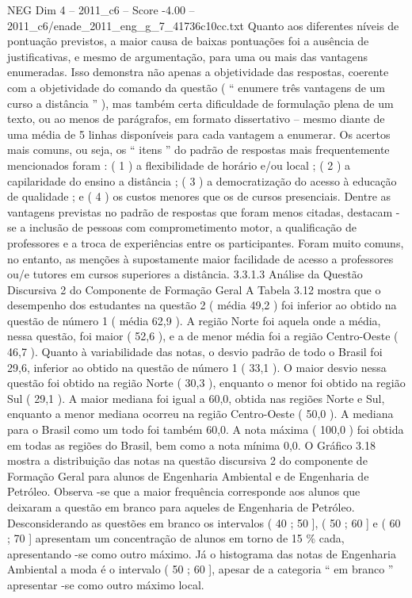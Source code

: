 \begin{textsample}{NEG Dim 4 – 2011\_c6 – Score -4.00 – 2011\_c6/enade\_2011\_eng\_g\_7\_41736c10cc.txt}
Quanto aos diferentes níveis de pontuação previstos, a maior causa de baixas pontuações foi a ausência de justificativas, e mesmo de argumentação, para uma ou mais das vantagens enumeradas.
Isso demonstra não apenas a objetividade das respostas, coerente com a objetividade do comando da questão ( “ enumere três vantagens de um curso a distância ” ), mas também certa dificuldade de formulação plena de um texto, ou ao menos de parágrafos, em formato dissertativo – mesmo diante de uma média de 5 linhas disponíveis para cada vantagem a enumerar.
Os acertos mais comuns, ou seja, os “ itens ” do padrão de respostas mais frequentemente mencionados foram : ( 1 ) a flexibilidade de horário e/ou local ; ( 2 ) a capilaridade do ensino a distância ; ( 3 ) a democratização do acesso à educação de qualidade ; e ( 4 ) os custos menores que os de cursos presenciais.
Dentre as vantagens previstas no padrão de respostas que foram menos citadas, destacam -se a inclusão de pessoas com comprometimento motor, a qualificação de professores e a troca de experiências entre os participantes.
Foram muito comuns, no entanto, as menções à supostamente maior facilidade de acesso a professores ou/e tutores em cursos superiores a distância. 3.3.1.3 Análise da Questão Discursiva 2 do Componente de Formação Geral A Tabela 3.12 mostra que o desempenho dos estudantes na questão 2 ( média 49,2 ) foi inferior ao obtido na questão de número 1 ( média 62,9 ).
A região Norte foi aquela onde a média, nessa questão, foi maior ( 52,6 ), e a de menor média foi a região Centro-Oeste ( 46,7 ).
Quanto à variabilidade das notas, o desvio padrão de todo o Brasil foi 29,6, inferior ao obtido na questão de número 1 ( 33,1 ).
O maior desvio nessa questão foi obtido na região Norte ( 30,3 ), enquanto o menor foi obtido na região Sul ( 29,1 ).
A maior mediana foi igual a 60,0, obtida nas regiões Norte e Sul, enquanto a menor mediana ocorreu na região Centro-Oeste ( 50,0 ).
A mediana para o Brasil como um todo foi também 60,0.
A nota máxima ( 100,0 ) foi obtida em todas as regiões do Brasil, bem como a nota mínima 0,0.
O Gráfico 3.18 mostra a distribuição das notas na questão discursiva 2 do componente de Formação Geral para alunos de Engenharia Ambiental e de Engenharia de Petróleo.
Observa -se que a maior frequência corresponde aos alunos que deixaram a questão em branco para aqueles de Engenharia de Petróleo.
Desconsiderando as questões em branco os intervalos ( 40 ; 50 ], ( 50 ; 60 ] e ( 60 ; 70 ] apresentam um concentração de alunos em torno de 15 \% cada, apresentando -se como outro máximo.
Já o histograma das notas de Engenharia Ambiental a moda é o intervalo ( 50 ; 60 ], apesar de a categoria “ em branco ” apresentar -se como outro máximo local.

\end{textsample}
